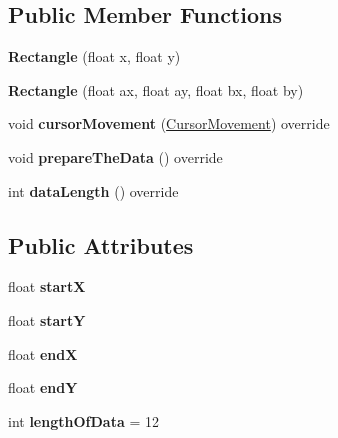 \subsection*{Public Member Functions}
\begin{DoxyCompactItemize}
\item 
\hypertarget{classRectangle_afcbe2665892e9ed1d32a7400ab1b9160}{}{\bfseries Rectangle} (float x, float y)\label{classRectangle_afcbe2665892e9ed1d32a7400ab1b9160}

\item 
\hypertarget{classRectangle_a16be353bdd049c8f642cd7d3b4156be5}{}{\bfseries Rectangle} (float ax, float ay, float bx, float by)\label{classRectangle_a16be353bdd049c8f642cd7d3b4156be5}

\item 
\hypertarget{classRectangle_a45934f6a755e957b821e33bafaff2da8}{}void {\bfseries cursor\+Movement} (\hyperlink{classCursorMovement}{Cursor\+Movement}) override\label{classRectangle_a45934f6a755e957b821e33bafaff2da8}

\item 
\hypertarget{classRectangle_a1d1cae3a05652d498f20b3a747082347}{}void {\bfseries prepare\+The\+Data} () override\label{classRectangle_a1d1cae3a05652d498f20b3a747082347}

\item 
\hypertarget{classRectangle_ac53e8b8a9c1e0df7c36d5d9d83070968}{}int {\bfseries data\+Length} () override\label{classRectangle_ac53e8b8a9c1e0df7c36d5d9d83070968}

\end{DoxyCompactItemize}
\subsection*{Public Attributes}
\begin{DoxyCompactItemize}
\item 
\hypertarget{classRectangle_a1999e2aa3c8ee35d2f57f90cb376b7c6}{}float {\bfseries start\+X}\label{classRectangle_a1999e2aa3c8ee35d2f57f90cb376b7c6}

\item 
\hypertarget{classRectangle_a0620f8b1b4a30cfd3bcc826811916a13}{}float {\bfseries start\+Y}\label{classRectangle_a0620f8b1b4a30cfd3bcc826811916a13}

\item 
\hypertarget{classRectangle_aa250ce84a1649311b750558201b2bfc5}{}float {\bfseries end\+X}\label{classRectangle_aa250ce84a1649311b750558201b2bfc5}

\item 
\hypertarget{classRectangle_abf43dca674d8142c428448283b4274c8}{}float {\bfseries end\+Y}\label{classRectangle_abf43dca674d8142c428448283b4274c8}

\item 
\hypertarget{classRectangle_a4fbb1c8e4315a2fba2242959ba8bf4fa}{}int {\bfseries length\+Of\+Data} = 12\label{classRectangle_a4fbb1c8e4315a2fba2242959ba8bf4fa}

\end{DoxyCompactItemize}
